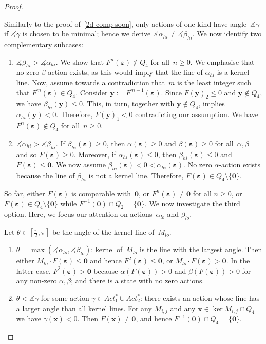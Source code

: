 \documentclass[preprint,12pt]{elsarticle}
\theoremstyle{plain}
\theoremstyle{definition}
\theoremstyle{remark}
\theoremstyle{claimstyle}
\newcommand{\eps}{\bm{\varepsilon}}
\begin{document}
\begin{proof}
\begin{enumerate}
		Similarly to the proof of~\cref{2d-comp-soon}, 
		only actions of one kind have angle~$\measuredangle\gamma$ 
		if $\measuredangle\gamma$ is chosen to be minimal;
		hence we derive $\measuredangle\alpha_{hi} \neq \measuredangle\beta_{hi}$. 
		We now identify two complementary subcases:
		\begin{enumerate}
			\item $\measuredangle\beta_{hi} > \measuredangle\alpha_{hi}$. We show that $F^n(\eps) \not\in Q_4$ for all~$n \geq 0$.
			We emphasise that no zero $\beta$-action exists, as this would imply that the line of $\alpha_{hi}$ is a kernel line.
			Now, assume towards a contradiction that~$m$ is the least integer such that $F^m(\eps) \in Q_4$.
			Consider $\bm{y}:= F^{m-1}(\eps)$.
			Since $F(\bm{y})_2 \leq 0$ and $\bm{y} \not\in Q_4$, we have $\beta_{hi}(\bm{y}) \leq 0$.
			This, in turn, together with $\bm{y} \not\in Q_4$, implies $\alpha_{hi}(\bm{y}) < 0$. Therefore, $F(\bm{y})_1 < 0$ contradicting our assumption.
			We have $F^n(\eps) \not\in Q_4$ for all~$n \geq 0$.
			
			\item $\measuredangle\alpha_{hi} > \measuredangle\beta_{hi}$. If $\beta_{hi}(\eps) \geq 0$, then $\alpha(\eps) \geq 0$ and $\beta(\eps) \geq 0$ for all~$\alpha, \beta$ and so $F(\eps) \geq 0$.
			Moreover, if $\alpha_{hi}(\eps) \leq 0$, then $\beta_{hi}(\eps) \leq 0$ and $F(\eps) \leq \bm{0}$.
			We now assume $\beta_{hi}(\eps) < 0 < \alpha_{hi}(\eps)$. 
			No zero $\alpha$-action exists because the line of $\beta_{hi}$ is not a kernel line. 
			Therefore, $F(\eps) \in Q_4\setminus\{\bm{0}\}$.
		\end{enumerate}
	\end{enumerate}

	So far, either $F(\eps)$ is comparable with~$\bm{0}$, 
	or $F^n(\eps) \neq \bm{0}$ for all $n \geq 0$,
	or $F(\eps) \in Q_4\setminus \{\bm{0}\}$ while $F^{-1}(\bm{0}) \cap Q_2 = \{\bm{0}\}$.
	We now investigate the third option.
	Here, we focus our attention on actions~$\alpha_{lo}$ and $\beta_{lo}$.
	
	Let $\theta \in [\frac{\pi}{2}, \pi]$ be the angle of the kernel line of~$M_{lo}$.
	\begin{enumerate}
		\item $\theta = \max(\measuredangle \alpha_{lo}, \measuredangle \beta_{lo})$: kernel of~$M_{lo}$ is the line with the largest angle. Then 
		either $M_{lo}\cdot F(\eps) \leq \bm{0}$ and hence $F^2(\eps) \leq \bm{0}$, or $M_{lo} \cdot F(\eps) > \bm{0}$. In the latter case, $F^2(\eps) > \bm{0}$ because $\alpha(F(\eps)) > 0$ and $\beta(F(\eps)) > 0$ for any non-zero $\alpha,\beta$; 
		and there is a state with no zero actions.
		\item $\theta < \measuredangle\gamma$ for some action $\gamma \in Act_1^* \cup Act_2^*$: there exists an action whose line has a larger angle than all kernel lines.
		For any $M_{i,j}$ and any $\bm{x} \in \ker M_{i,j} \cap Q_4$ we have $\gamma(\bm{x}) < 0$. Then $F(\bm{x}) \neq \bm{0}$, and hence $F^{-1}(\bm{0}) \cap Q_4 = \{\bm{0}\}$. 
		

\end{enumerate}
\end{proof}
\end{document}

